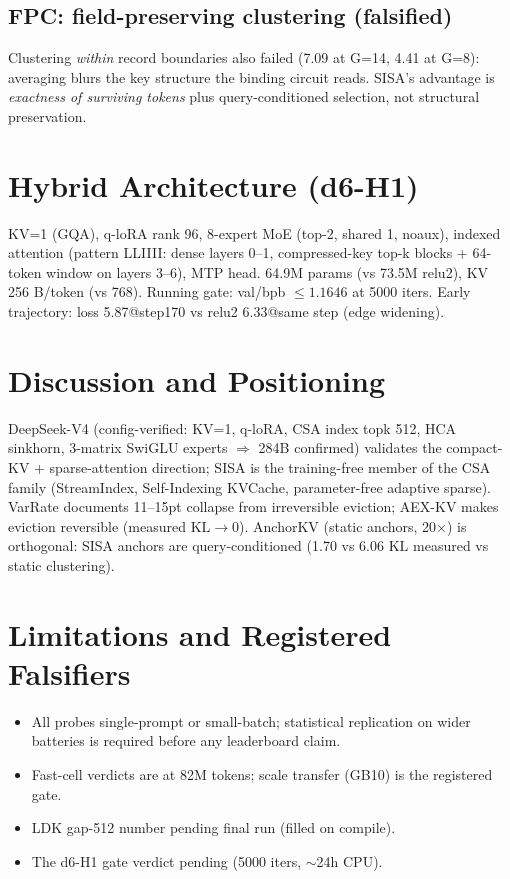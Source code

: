 \documentclass[11pt]{article}
\newcommand{\sisa}{SISA}
\newcommand{\kl}{\mathrm{KL}}
\begin{document}
\subsection{FPC: field-preserving clustering (falsified)}
Clustering \emph{within} record boundaries also failed (7.09 at G=14, 4.41
at G=8): averaging blurs the key structure the binding circuit reads.
\sisa{}'s advantage is \emph{exactness of surviving tokens} plus
query-conditioned selection, not structural preservation.

\section{Hybrid Architecture (d6-H1)}
\label{sec:hybrid}
KV=1 (GQA), q-loRA rank 96, 8-expert MoE (top-2, shared 1, noaux), indexed
attention (pattern LLIIII: dense layers 0--1, compressed-key top-k blocks +
64-token window on layers 3--6), MTP head. 64.9M params (vs 73.5M relu2),
KV 256 B/token (vs 768). Running gate: val/bpb $\le 1.1646$ at 5000 iters.
Early trajectory: loss 5.87@step170 vs relu2 6.33@same step (edge widening).

\section{Discussion and Positioning}
\label{sec:disc}
DeepSeek-V4 (config-verified: KV=1, q-loRA, CSA index topk 512, HCA
sinkhorn, 3-matrix SwiGLU experts $\Rightarrow$ 284B confirmed) validates
the compact-KV + sparse-attention direction; \sisa{} is the training-free
member of the CSA family (StreamIndex, Self-Indexing KVCache,
parameter-free adaptive sparse). VarRate documents 11--15pt collapse from
irreversible eviction; AEX-KV makes eviction reversible (measured
$\kl\to0$). AnchorKV (static anchors, 20$\times$) is orthogonal: \sisa{}
anchors are query-conditioned (1.70 vs 6.06 $\kl$ measured vs static
clustering).

\section{Limitations and Registered Falsifiers}
\begin{itemize}
\item All probes single-prompt or small-batch; statistical replication on
wider batteries is required before any leaderboard claim.
\item Fast-cell verdicts are at 82M tokens; scale transfer (GB10) is the
registered gate.
\item LDK gap-512 number pending final run (filled on compile).
\item The d6-H1 gate verdict pending (5000 iters, $\sim$24h CPU).
\end{itemize}
\end{document}
